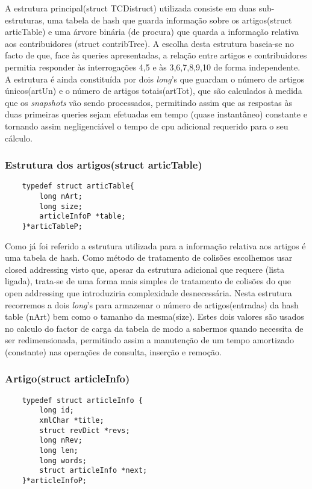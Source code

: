 \documentclass{report}
\begin{document}
A estrutura principal(struct TCDistruct) utilizada consiste em duas sub-estruturas, uma tabela de hash que guarda informação sobre os artigos(struct articTable) e uma árvore binária (de procura) que quarda a informação relativa aos contribuidores (struct contribTree). A escolha desta estrutura baseia-se no facto de que, face às queries apresentadas, a relação entre artigos e  contribuidores permitia responder às interrogações 4,5 e às 3,6,7,8,9,10 de forma independente. A estrutura é ainda constituída por dois \textit{long}'s que guardam o número de artigos únicos(artUn) e o número de artigos totais(artTot), que são calculados à medida que os \textit{snapshots} vão sendo processados, permitindo assim que as respostas às duas primeiras queries sejam efetuadas em tempo (quase instantâneo) constante e tornando assim negligenciável o tempo de cpu adicional requerido para o seu cálculo.

\subsubsection{Estrutura dos artigos(struct articTable)}
\begin{verbatim}
    typedef struct articTable{
        long nArt;
        long size;
        articleInfoP *table;
    }*articTableP;
\end{verbatim}


Como já foi referido a estrutura utilizada para a informação relativa aos artigos é uma tabela de hash. Como método de tratamento de colisões escolhemos usar closed addressing visto que, apesar da estrutura adicional que requere (lista ligada), trata-se de uma forma mais simples de tratamento de colisões do que open addressing que introduziria complexidade desnecessária.
Nesta estrutura recorremos a dois \textit{long}'s para armazenar o número de artigos(entradas) da hash table (nArt) bem como o tamanho da mesma(size). Estes dois valores são usados no calculo do factor de carga da tabela de modo a sabermos quando necessita de ser redimensionada, permitindo assim a manutenção de um tempo amortizado (constante) nas operações de consulta, inserção e remoção. 

\subsubsection{Artigo(struct articleInfo)}
\begin{verbatim}
    typedef struct articleInfo {
        long id; 
        xmlChar *title;
        struct revDict *revs;
        long nRev;
        long len;
        long words;
        struct articleInfo *next;
    }*articleInfoP;    
\end{verbatim}
\end{document}
